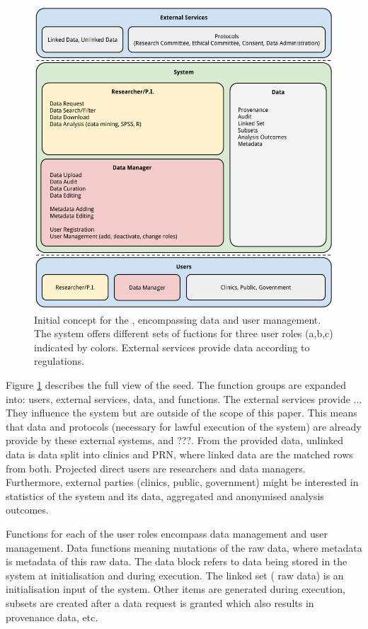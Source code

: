 \begin{figure}[t]
	\centering
	\includegraphics[width=1.0\linewidth]{images/brainstorm-before}
	\caption{
		Initial concept for the \ivfsystem{}, encompassing data and user management. 
		The system offers different sets of fuctions for three user roles (a,b,c) indicated by colors. 
		External services provide data according to regulations.
	}
	\label{fig:brainstorm-before}
\end{figure}

Figure \ref{fig:brainstorm-before} describes the full view of the seed. The function groups are expanded into: users, external services, data, and functions.
The external services provide ...
They influence the system but are outside of the scope of this paper.
This means that data and protocols (necessary for lawful execution of the system) 
are already provide by these external systems, and ???.
From the provided data, unlinked data is \project{} data split into clinics and PRN, where linked data are the matched rows from both.
Projected direct users are researchers and data managers.
Furthermore, external parties (clinics, public, government) might be interested in statistics of the system and its data, \eg{} aggregated and anonymised analysis outcomes.

Functions for each of the user roles encompass data management and user management.
Data functions meaning mutations of the raw \project{} data, where metadata is metadata of this raw data. 
The data block refers to data being stored in the system at initialisation and during execution.
The linked set (\ie{} raw data) is an initialisation input of the system.
Other items are generated during execution, \eg{} subsets are created after a data request is granted which also results in provenance data, etc.